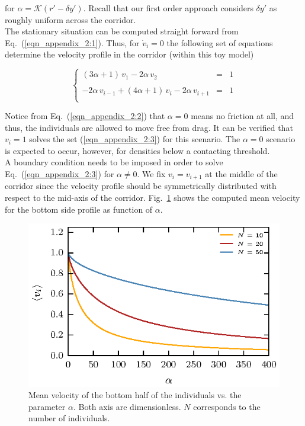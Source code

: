 \documentclass[preprint,12pt]{elsarticle}
\begin{document}
\noindent for $\alpha=\mathcal{K}(r'-\delta y')$. Recall that our first order 
approach considers $\delta y'$ as roughly uniform across the corridor. \\

The stationary situation can be computed straight forward from 
Eq.~(\ref{eqn_appendix_2:1}). Thus, for $\dot{v}_{i}=0$ the following set of 
equations determine the velocity profile in the corridor (within this toy 
model)

\begin{equation}
  \left\{\begin{array}{lcl}
          (3\alpha+1)\,v_{1} - 2\alpha\,v_{2} & = & 1 \\
          & & \\
          -2\alpha\,v_{i-1}+(4\alpha+1)\,v_i-2\alpha\,v_{i+1} & = & 1\\
         \end{array}\right.\label{eqn_appendix_2:3}
\end{equation}

Notice from  Eq.~(\ref{eqn_appendix_2:2}) that $\alpha=0$ means no friction at 
all, and thus, the individuals are allowed to move free from drag. It can be 
verified that $v_i=1$ solves the set (\ref{eqn_appendix_2:3}) for this 
scenario. The $\alpha=0$ scenario is expected to occur, however, for densities 
below a contacting threshold. \\

A boundary condition needs to be imposed in order to solve 
Eq.~(\ref{eqn_appendix_2:3}) for $\alpha\neq 0$. We fix 
$v_i=v_{i+1}$ at the middle of the corridor since the velocity profile 
should be symmetrically distributed with respect to the mid-axis of the 
corridor. Fig.~\ref{fig:appendix_2:1} shows the computed mean velocity for the 
bottom side profile as function of $\alpha$.\\


\begin{figure}[htbp!]
\centering
\includegraphics[width=0.7\columnwidth]
{./fig_velocity_model.eps}
\caption{\label{fig:appendix_2:1} Mean velocity of the bottom half of the 
individuals vs. the parameter $\alpha$. Both axis are dimensionless. $N$ 
corresponds to the number of individuals. }
\end{figure}
\end{document}
